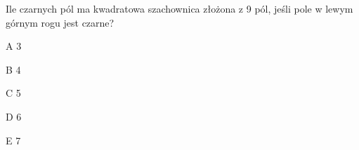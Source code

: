 \begin{tresc}
Ile czarnych pól ma kwadratowa szachownica złożona z 9 pól, jeśli pole w lewym górnym rogu jest czarne?
\end{tresc}
\begin{wariant}{A} 3 \end{wariant}
\begin{wariant}{B} 4 \end{wariant}
\begin{wariant}{C} 5 \end{wariant}
\begin{wariant}{D} 6 \end{wariant}
\begin{wariant}{E} 7 \end{wariant}
